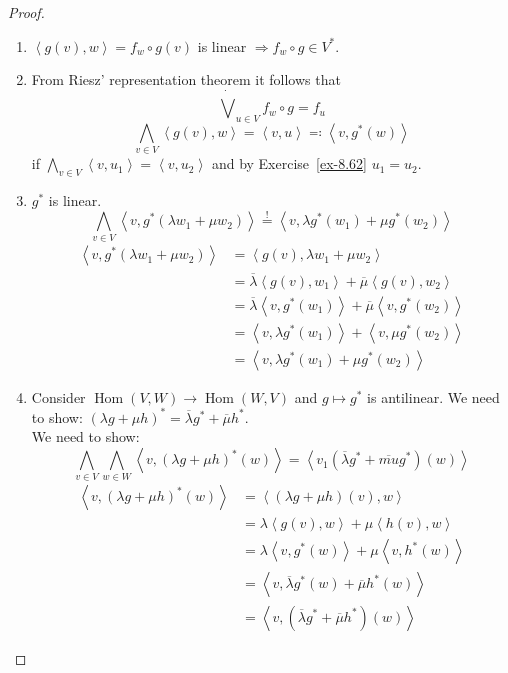 \documentclass[a4paper,landscape,twocolumn]{article}
\newcommand\functional[1]{\left\langle{#1}\right\rangle}
\theoremstyle{definition}
\DeclareMathOperator\Hom{Hom} %
\begin{document}
\begin{proof}
  \begin{enumerate}
    \item $\functional{g(v), w} = f_w \circ g(v)$ is linear $\Rightarrow f_w \circ g \in V^*$.
    \item From Riesz' representation theorem it follows that
      \[ \dot\bigvee_{u \in V} f_w \circ g = f_u \]
      \[ \bigwedge_{v \in V} \functional{g(v), w} = \functional{v,u} \eqqcolon \functional{v, g^*(w)} \]
      if $\bigwedge_{v \in V} \functional{v, u_1} = \functional{v, u_2}$ and by Exercise~\ref{ex-8.62} $u_1 = u_2$.
    \item
      $g^*$ is linear.
      \[ \bigwedge_{v \in V} \functional{v, g^*(\lambda w_1 + \mu w_2)} \stackrel{!}{=} \functional{v, \lambda g^*(w_1) + \mu g^*(w_2)} \]
      \begin{align*}
        \functional{v, g^*(\lambda w_1 + \mu w_2)}
          &= \functional{g(v), \lambda w_1 + \mu w_2} \\
          &= \overline{\lambda} \functional{g(v), w_1} + \overline{\mu} \functional{g(v), w_2} \\
          &= \overline{\lambda} \functional{v, g^*(w_1)} + \overline{\mu} \functional{v, g^*(w_2)} \\
          &= \functional{v, \lambda g^*(w_1)} + \functional{v, \mu g^*(w_2)} \\
          &= \functional{v, \lambda g^*(w_1) + \mu g^*(w_2)}
      \end{align*}
    \item Consider $\Hom(V,W) \to \Hom(W, V)$ and $g \mapsto g^*$ is antilinear.
      We need to show: $(\lambda g + \mu h)^* = \overline\lambda g^* + \overline\mu h^*$. \\
      We need to show:
      \[
        \bigwedge_{v \in V} \bigwedge_{w \in W} \functional{v, (\lambda g + \mu h)^*(w)} = \functional{v_1(\overline\lambda g^* + \overline{mu} g^*) (w)}
      \] \begin{align*}
        \functional{v, (\lambda g + \mu h)^*(w)}
          &= \functional{(\lambda g + \mu h)(v), w} \\
          &= \lambda \functional{g(v), w} + \mu \functional{h(v), w} \\
          &= \lambda \functional{v, g^*(w)} + \mu \functional{v, h^*(w)} \\
          &= \functional{v, \overline\lambda g^*(w) + \overline\mu h^*(w)} \\
          &= \functional{v, (\overline\lambda g^* + \overline\mu h^*)(w)}

\end{align*}
\end{enumerate}
\end{proof}
\end{document}
